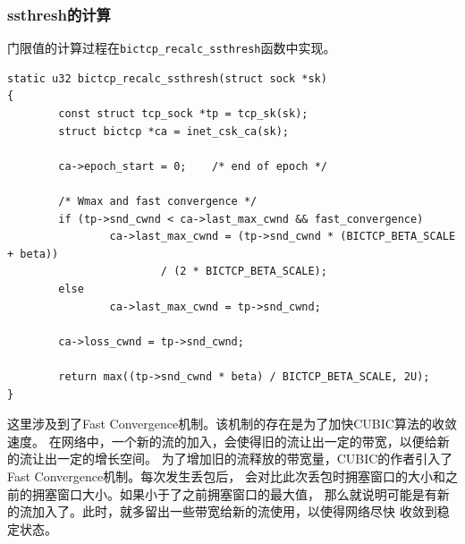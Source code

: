 \subsubsection{ssthresh的计算}
门限值的计算过程在\texttt{bictcp_recalc_ssthresh}函数中实现。
\begin{verbatim}
static u32 bictcp_recalc_ssthresh(struct sock *sk)
{
        const struct tcp_sock *tp = tcp_sk(sk);
        struct bictcp *ca = inet_csk_ca(sk);

        ca->epoch_start = 0;    /* end of epoch */

        /* Wmax and fast convergence */
        if (tp->snd_cwnd < ca->last_max_cwnd && fast_convergence)
                ca->last_max_cwnd = (tp->snd_cwnd * (BICTCP_BETA_SCALE + beta))
                        / (2 * BICTCP_BETA_SCALE);
        else
                ca->last_max_cwnd = tp->snd_cwnd;

        ca->loss_cwnd = tp->snd_cwnd;

        return max((tp->snd_cwnd * beta) / BICTCP_BETA_SCALE, 2U);
}
\end{verbatim}
这里涉及到了Fast Convergence机制。该机制的存在是为了加快CUBIC算法的收敛速度。
在网络中，一个新的流的加入，会使得旧的流让出一定的带宽，以便给新的流让出一定的增长空间。
为了增加旧的流释放的带宽量，CUBIC的作者引入了Fast Convergence机制。每次发生丢包后，
会对比此次丢包时拥塞窗口的大小和之前的拥塞窗口大小。如果小于了之前拥塞窗口的最大值，
那么就说明可能是有新的流加入了。此时，就多留出一些带宽给新的流使用，以使得网络尽快
收敛到稳定状态。

